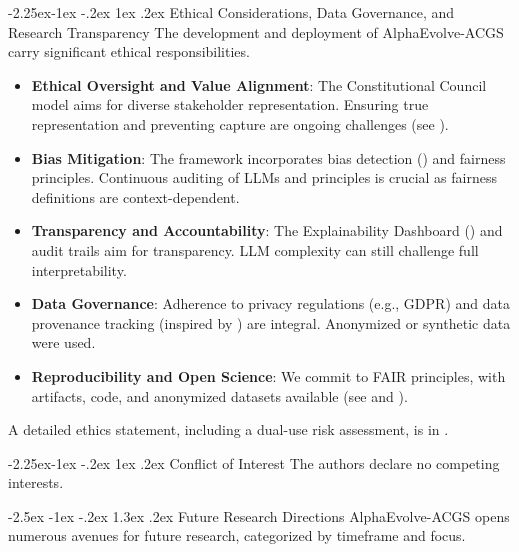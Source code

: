 \documentclass[manuscript,screen,9pt]{acmart}
\makeatletter
\renewcommand\section{\@startsection{section}{1}{\z@}%
  {-2.5ex \@plus -1ex \@minus -.2ex}%
  {1.3ex \@plus.2ex}%
  {\normalfont\Large\bfseries}}
\renewcommand\subsection{\@startsection{subsection}{2}{\z@}%
  {-2.25ex\@plus -1ex \@minus -.2ex}%
  {1ex \@plus .2ex}%
  {\normalfont\large\bfseries}}
\makeatother
\begin{document}
\subsection{Ethical Considerations, Data Governance, and Research Transparency}
\label{subsec:ethics_governance_reproducibility} 
The development and deployment of AlphaEvolve-ACGS carry significant ethical responsibilities.
\begin{itemize}[leftmargin=*,itemsep=1pt,parsep=1pt]
    \item \textbf{Ethical Oversight and Value Alignment}: The Constitutional Council model aims for diverse stakeholder representation. Ensuring true representation and preventing capture are ongoing challenges (see ).
    \item \textbf{Bias Mitigation}: The framework incorporates bias detection () and fairness principles. Continuous auditing of LLMs and principles is crucial as fairness definitions are context-dependent.
    \item \textbf{Transparency and Accountability}: The Explainability Dashboard () and audit trails aim for transparency. LLM complexity can still challenge full interpretability.
    \item \textbf{Data Governance}: Adherence to privacy regulations (e.g., GDPR) and data provenance tracking (inspired by \cite{Gebru2021DatasheetDatasets}) are integral. Anonymized or synthetic data were used.
    \item \textbf{Reproducibility and Open Science}: We commit to FAIR principles, with artifacts, code, and anonymized datasets available (see  and ).
\end{itemize}
A detailed ethics statement, including a dual-use risk assessment, is in .

\subsection{Conflict of Interest}
The authors declare no competing interests.

\section{Future Research Directions}
\label{sec:future_work}
AlphaEvolve-ACGS opens numerous avenues for future research, categorized by timeframe and focus.
\end{document}
